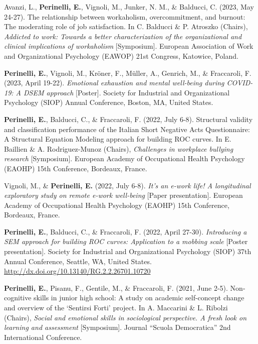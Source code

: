 \documentclass[hidelinks, letterpaper,10pt]{article} %
\begin{document}
\begin{etaremune}
	\item Avanzi, L., \textbf{Perinelli, E.}, Vignoli, M., Junker, N. M., \& Balducci, C. (2023, May 24-27). The relationship between workaholism, overcommitment, and burnout: The moderating role of job satisfaction. In C. Balducci \& P. Atroszko (Chairs), \textit{Addicted to work: Towards a better characterization of the organizational and clinical implications of workaholism} [Symposium]. European Association of Work and Organizational Psychology (EAWOP) 21st Congress, Katowice, Poland.

	\item \textbf{Perinelli, E.}, Vignoli, M., Kröner, F., Müller, A., Genrich, M., \& Fraccaroli, F. (2023, April 19-22). \textit{Emotional exhaustion and mental well-being during COVID-19: A DSEM approach} [Poster]. Society for Industrial and Organizational Psychology (SIOP) Annual Conference, Boston, MA, United States.

    \item \textbf{Perinelli, E.}, Balducci, C., \& Fraccaroli, F. (2022, July 6-8). Structural validity and classification performance of the Italian Short Negative Acts Questionnaire: A Structural Equation Modeling approach for building ROC curves. In E. Baillien \& A. Rodriguez-Munoz (Chairs), \textit{Challenges in workplace bullying research} [Symposium]. European Academy of Occupational Health Psychology (EAOHP) 15th Conference, Bordeaux, France.
    
    \item Vignoli, M., \& \textbf{Perinelli, E.} (2022, July 6-8). \textit{It’s an e-work life! A longitudinal exploratory study on remote e-work well-being} [Paper presentation]. European Academy of Occupational Health Psychology (EAOHP) 15th Conference, Bordeaux, France. 

   \item \textbf{Perinelli, E.}, Balducci, C., \& Fraccaroli, F. (2022, April 27-30). \textit{Introducing a SEM approach for building ROC curves: Application to a mobbing scale} [Poster presentation]. Society for Industrial and Organizational Psychology (SIOP) 37th Annual Conference, Seattle, WA, United States. \url{http://dx.doi.org/10.13140/RG.2.2.26701.10720} 

    \item \textbf{Perinelli, E.}, Pisanu, F., Gentile, M., \& Fraccaroli, F. (2021, June 2-5). Non-cognitive skills in junior high school: A study on academic self-concept change and overview of the ‘Sentirsi Forti’ project. In A. Maccarini \& L. Ribolzi (Chairs), \textit{Social and emotional skills in sociological perspective. A fresh look on learning and assessment} [Symposium]. Journal ``Scuola Democratica'' 2nd International Conference.


\end{etaremune}
\end{document}
